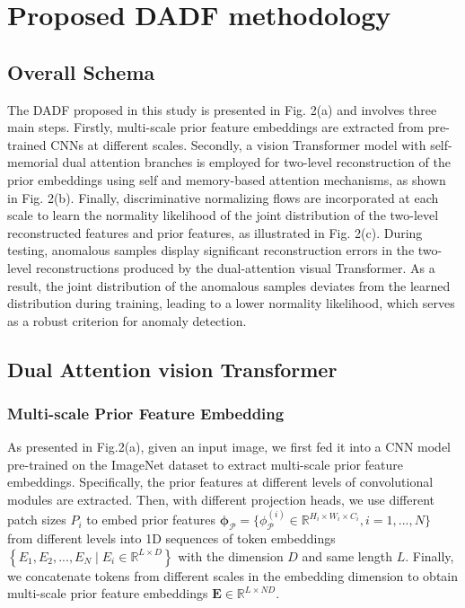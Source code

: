 \documentclass[journal]{IEEEtran}
\begin{document}
\section{Proposed DADF methodology}

\subsection{Overall Schema}

The DADF proposed in this study is presented in Fig. 2(a) and involves three main steps. Firstly, multi-scale prior feature embeddings are extracted from pre-trained CNNs at different scales. Secondly, a vision Transformer model with self-memorial dual attention branches is employed for two-level reconstruction of the prior embeddings using self and memory-based attention mechanisms, as shown in Fig. 2(b). Finally, discriminative normalizing flows are incorporated at each scale to learn the normality likelihood of the joint distribution of the two-level reconstructed features and prior features, as illustrated in Fig. 2(c). During testing, anomalous samples display significant reconstruction errors in the two-level reconstructions produced by the dual-attention visual Transformer. As a result, the joint distribution of the anomalous samples deviates from the learned distribution during training, leading to a lower normality likelihood, which serves as a robust criterion for anomaly detection.
 
\subsection{Dual Attention vision Transformer}

\subsubsection{Multi-scale Prior Feature Embedding} 

As presented in Fig.2(a), given an input image, we first fed it into a CNN model pre-trained on the ImageNet dataset to extract multi-scale prior feature embeddings. Specifically, the prior features at different levels of convolutional modules are extracted. Then, with different projection heads, we use different patch sizes $P_{i}$ to embed prior features $\boldsymbol{\phi_{\mathcal{P}}}=\big\{ \phi_{\mathcal{P}}^{(i)}\in \mathbb{R} ^{H_{i}\times W_{i}\times C_{i}},i=1,...,N  \big\}$ from different levels into 1D sequences of token embeddings $\left \{  E_{1},E_{2},...,E_{N} \mid E_{i}\in \mathbb{R}^{L\times D} \right \}$ with the dimension $D$ and same length $L$. Finally, we concatenate tokens from different scales in the embedding dimension to obtain multi-scale prior feature embeddings $\mathbf{E}\in \mathbb{R}^{L\times ND}$. 
\end{document}

